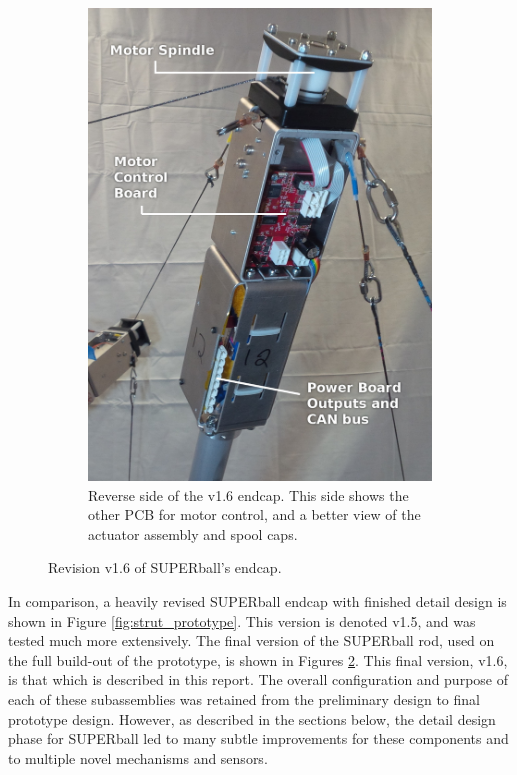 \documentclass[12pt]{report}
\begin{document}
\begin{figure}
  \begin{subfigure}[t]{0.43\textwidth}
    \includegraphics[width=1\textwidth]{img/endcap_upclose_motorboard_labelled.jpg}
    \caption{Reverse side of the v1.6 endcap. This side shows the other PCB for motor control, and a better view of the actuator assembly and spool caps.}
    \label{fig:final_endcap_reverse}
  \end{subfigure}
  \caption{Revision v1.6 of SUPERball's endcap.~\cite{sabelhaus2015system}}
  \label{fig:final_endcap}
\end{figure}

In comparison, a heavily revised SUPERball endcap with finished detail design is shown in Figure \ref{fig:strut_prototype}.
This version is denoted v1.5, and was tested much more extensively.
The final version of the SUPERball rod, used on the full build-out of the prototype, is shown in Figures \ref{fig:final_endcap}.
This final version, v1.6, is that which is described in this report.
The overall configuration and purpose of each of these subassemblies was retained from the preliminary design to final prototype design.
However, as described in the sections below, the detail design phase for SUPERball led to many subtle improvements for these components and to multiple novel mechanisms and sensors.
\end{document}
